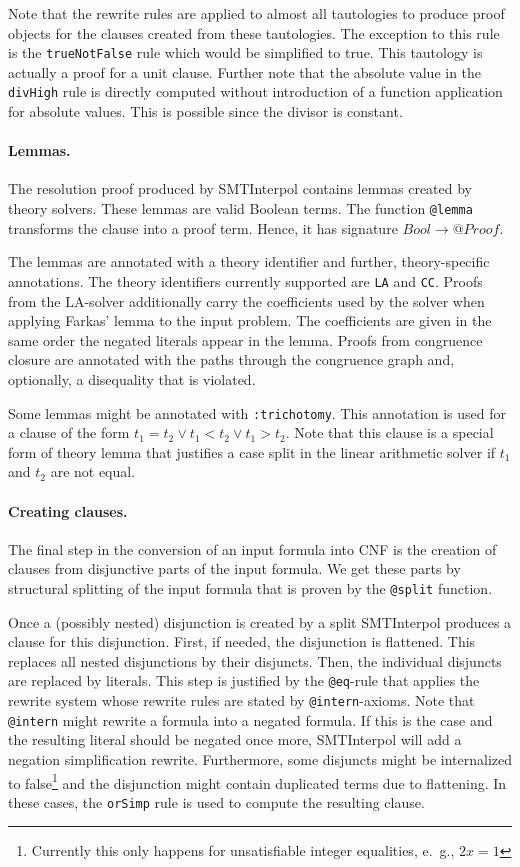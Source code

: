 \documentclass[a4paper]{article}
\newcommand\si{SMTInterpol\xspace}
\begin{document}
Note that the rewrite rules are applied to almost all tautologies to produce
proof objects for the clauses created from these tautologies.  The exception
to this rule is the \verb+trueNotFalse+ rule which would be simplified to
true.  This tautology is actually a proof for a unit clause.  Further note
that the absolute value in the \verb+divHigh+ rule is directly computed
without introduction of a function application for absolute values.  This is
possible since the divisor is constant.

\paragraph{Lemmas.}  The resolution proof produced by \si contains lemmas
created by theory solvers.  These lemmas are valid Boolean terms.  The
function \verb+@lemma+ transforms the clause into a proof term.  Hence, it has
signature $Bool\rightarrow @Proof$.

The lemmas are annotated with a theory identifier and further,
theory-specific annotations.  The theory identifiers currently supported are
\verb+LA+ and \verb+CC+.  Proofs from the LA-solver additionally carry the
coefficients used by the solver when applying Farkas' lemma to the input
problem.  The coefficients are given in the same order the negated literals
appear in the lemma.  Proofs from congruence closure are annotated with the
paths through the congruence graph and, optionally, a disequality that is
violated.

Some lemmas might be annotated with \verb+:trichotomy+.  This annotation is
used for a clause of the form $t_1=t_2\lor t_1<t_2\lor t_1 > t_2$.  Note that
this clause is a special form of theory lemma that justifies a case split in
the linear arithmetic solver if $t_1$ and $t_2$ are not equal.

\paragraph{Creating clauses.}  The final step in the conversion of an input
formula into CNF is the creation of clauses from disjunctive parts of the
input formula.  We get these parts by structural splitting of the input
formula that is proven by the \verb+@split+ function.

Once a (possibly nested) disjunction is created by a split \si produces a
clause for this disjunction.  First, if needed, the disjunction is flattened.
This replaces all nested disjunctions by their disjuncts.  Then, the
individual disjuncts are replaced by literals.  This step is justified by the
\verb+@eq+-rule that applies the rewrite system whose rewrite rules are stated
by \verb+@intern+-axioms.   Note that \verb+@intern+ might rewrite a formula
into a negated formula.  If this is the case and the resulting literal should
be negated once more, \si will add a negation simplification rewrite.
Furthermore, some disjuncts might be internalized to false\footnote{Currently
  this only happens for unsatisfiable integer equalities, e.~g., $2x=1$} and
the disjunction might contain duplicated terms due to flattening.  In these
cases, the \verb+orSimp+ rule is used to compute the resulting clause.
\end{document}

